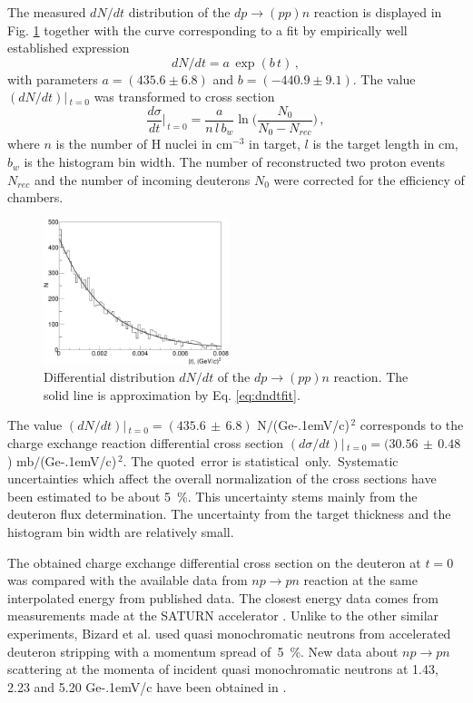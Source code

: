 \documentclass[twocolumn,epjc3]{svjour3}
\newcommand{\np}     {\ensuremath{np \rightarrow pn}\xspace}
\newcommand{\dpchex} {\ensuremath{dp \rightarrow (pp)n}\xspace}
\newcommand{\GeVc}   {Ge\kern-.1emV/c\xspace}
\begin{document}
The measured $dN/dt$ distribution of the \dpchex reaction is displayed in
Fig. \ref{fig:dndt} together with the curve corresponding to a fit by
empirically well established expression
\begin{equation}
  dN/dt = a\,\exp(b\,t)\,,
  \label{eq:dndtfit}
\end{equation}
with parameters $a=(435.6 \pm 6.8)$ and $b=(-440.9 \pm 9.1)$. The value
$(dN/dt)|\,_{t=0}$ was transformed to cross section
\begin{equation}
  \frac{d\sigma}{dt}\Big|_{\,t=0} =
  \frac{a}{n\,l\,b_w}\ln\bigg(\frac{N_0}{N_0-N_{rec}}\bigg)\,,
\end{equation}
where $n$ is the number of H nuclei in cm$^{-3}$ in target, $l$ is the target
length in cm, $b_w$ is the histogram bin width. The number of reconstructed two
proton events $N_{rec}$ and the number of incoming deuterons $N_0$ were
corrected for the efficiency of chambers.

\begin{figure}[h]
  \centering
  \includegraphics[width=0.48\textwidth]{dp_dN.pdf}
  \caption{Differential distribution $dN/dt$ of the \dpchex reaction. The solid
    line is approximation by Eq. \eqref{eq:dndtfit}.}
  \label{fig:dndt}
\end{figure}

The value $(dN/dt)|\,_{t=0}=(435.6\,\pm\,6.8)$ N$/$(\GeVc)$^{\,2}$ corresponds
to the charge exchange reaction differential cross section
$(d\sigma/dt)|\,_{t=0}=(30.56\,\pm\,0.48$) mb$/$(\GeVc)$^{\,2}$.
The quoted \,error is statistical \,only. \,Systematic uncertainties which
affect the overall normalization of the cross sections have been estimated to be
about 5~\%. This uncertainty stems mainly from the deuteron flux determination.
The uncertainty from the target thickness and the histogram bin width are
relatively small.

The obtained charge exchange differential cross section on the deuteron at $t=0$
was compared with the available data from \np reaction at the same interpolated
energy from published data. The closest energy data comes from measurements made
at the SATURN accelerator \cite{biz75,bys78}. Unlike to the other similar
experiments, Bizard et al. \cite{biz75} used quasi monochromatic neutrons from
accelerated deuteron stripping with a momentum spread of~5~\%. New data about
\np scattering at the momenta of incident quasi monochromatic neutrons at 1.43,
2.23 and 5.20 \GeVc have been obtained in \cite{tro14}.
\end{document}
